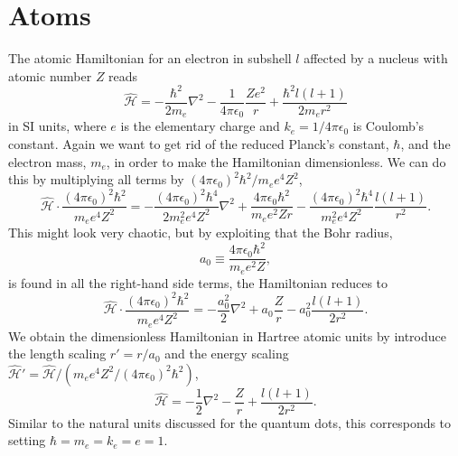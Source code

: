 \section{Atoms} \label{sec:atomicunits}
The atomic Hamiltonian for an electron in subshell $l$ affected by a nucleus with atomic number $Z$ reads
\begin{equation}
\hat{\mathcal{H}}=-\frac{\hbar^2}{2m_e}\nabla^2-\frac{1}{4\pi\epsilon_0}\frac{Ze^2}{r}+\frac{\hbar^2l(l+1)}{2m_er^2}
\label{eq:HamiltonianAtomic}
\end{equation}
in SI units, where $e$ is the elementary charge and $k_e=1/4\pi\epsilon_0$ is Coulomb's constant. Again we want to get rid of the reduced Planck's constant, $\hbar$, and the electron mass, $m_e$, in order to make the Hamiltonian dimensionless. We can do this by multiplying all terms by $(4\pi\epsilon_0)^2\hbar^2/m_ee^4Z^2$,
\begin{equation}
\hat{\mathcal{H}}\cdot\frac{(4\pi\epsilon_0)^2\hbar^2}{m_ee^4Z^2}=-\frac{(4\pi\epsilon_0)^2\hbar^4}{2m_e^2e^4Z^2}\nabla^2+\frac{4\pi\epsilon_0\hbar^2}{m_ee^2Zr}-\frac{(4\pi\epsilon_0)^2\hbar^4}{m_e^2e^4Z^2}\frac{l(l+1)}{r^2}.
\end{equation}
This might look very chaotic, but by exploiting that the Bohr radius,
\begin{equation}
a_0\equiv\frac{4\pi\epsilon_0\hbar^2}{m_ee^2Z},
\end{equation}
is found in all the right-hand side terms, the Hamiltonian reduces to
\begin{equation}
\hat{\mathcal{H}}\cdot\frac{(4\pi\epsilon_0)^2\hbar^2}{m_ee^4Z^2}=-\frac{a_0^2}{2}\nabla^2+a_0\frac{Z}{r}-a_0^2\frac{l(l+1)}{2r^2}.
\end{equation}
We obtain the dimensionless Hamiltonian in Hartree atomic units by introduce the length scaling $r'=r/a_0$ and the energy scaling $\hat{\mathcal{H}}'=\hat{\mathcal{H}}/(m_ee^4Z^2/(4\pi\epsilon_0)^2\hbar^2)$,
\begin{equation}
\hat{\mathcal{H}}=-\frac{1}{2}\nabla^2-\frac{Z}{r}+\frac{l(l+1)}{2r^2}.
\end{equation}
Similar to the natural units discussed for the quantum dots, this corresponds to setting $\hbar=m_e=k_e=e=1$.